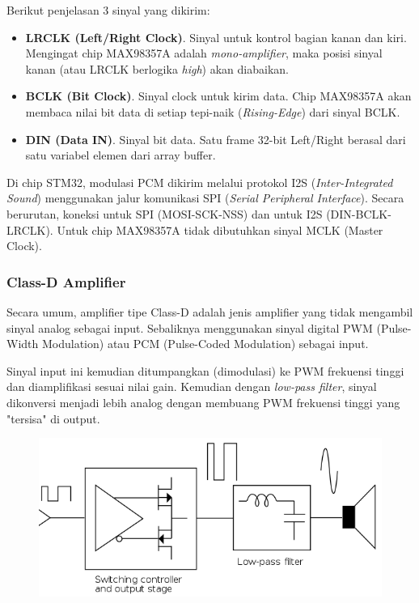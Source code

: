 \documentclass[12pt,]{article}
\begin{document}
	Berikut penjelasan 3 sinyal yang dikirim:
	\begin{itemize}
		\item \textbf{LRCLK (Left/Right Clock)}. Sinyal untuk kontrol bagian kanan dan kiri.
		Mengingat chip MAX98357A adalah \textit{mono-amplifier},
		maka posisi sinyal kanan (atau LRCLK berlogika \textit{high}) akan diabaikan.

		\item \textbf{BCLK (Bit Clock)}. Sinyal clock untuk kirim data.
		Chip MAX98357A akan membaca nilai bit data di setiap tepi-naik (\textit{Rising-Edge})
		dari sinyal BCLK.

		\item \textbf{DIN (Data IN)}. Sinyal bit data.
		Satu frame 32-bit Left/Right berasal dari satu variabel elemen dari array buffer.
	\end{itemize}

	Di chip STM32, modulasi PCM dikirim melalui protokol I2S (\textit{Inter-Integrated Sound})
	menggunakan jalur komunikasi SPI (\textit{Serial Peripheral Interface}).
	Secara berurutan, koneksi untuk SPI (MOSI-SCK-NSS) dan untuk I2S (DIN-BCLK-LRCLK).
	Untuk chip MAX98357A tidak dibutuhkan sinyal MCLK (Master Clock).

	\subsubsection{Class-D Amplifier}

	Secara umum, amplifier tipe Class-D adalah jenis amplifier yang tidak mengambil sinyal analog sebagai input.
	Sebaliknya menggunakan sinyal digital PWM (Pulse-Width Modulation) atau PCM (Pulse-Coded Modulation) sebagai input.

	Sinyal input ini kemudian ditumpangkan (dimodulasi) ke PWM frekuensi tinggi dan diamplifikasi sesuai nilai gain.
	Kemudian dengan \textit{low-pass filter}, sinyal dikonversi menjadi lebih analog
	dengan membuang PWM frekuensi tinggi yang "tersisa" di output.
	\begin{figure}[H]
		\centering
		\includegraphics[width=0.6\linewidth]{images/classD}
	\end{figure}
\end{document}
